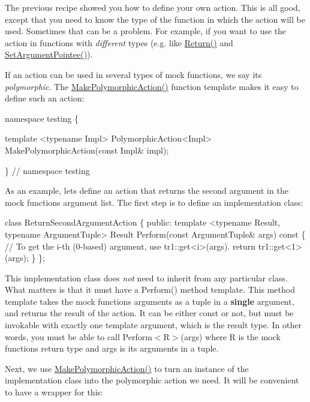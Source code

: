 The previous recipe showed you how to define your own action. This is all good, except that you need to know the type of the function in which the action will be used. Sometimes that can be a problem. For example, if you want to use the action in functions with {\itshape different} types (e.\+g. like {\ttfamily \hyperlink{namespacetesting_af6d1c13e9376c77671e37545cd84359c}{Return()}} and {\ttfamily \hyperlink{namespacetesting_a03b315d27c91a8e719f2b6c09964130b}{Set\+Argument\+Pointee()}}).

If an action can be used in several types of mock functions, we say it\textquotesingle{}s {\itshape polymorphic}. The {\ttfamily \hyperlink{namespacetesting_a36bd06c5ea972c6df0bd9f40a7a94c65}{Make\+Polymorphic\+Action()}} function template makes it easy to define such an action\+:


\begin{DoxyCode}
namespace testing \{

template <typename Impl>
PolymorphicAction<Impl> MakePolymorphicAction(const Impl& impl);

\}  // namespace testing
\end{DoxyCode}


As an example, let\textquotesingle{}s define an action that returns the second argument in the mock function\textquotesingle{}s argument list. The first step is to define an implementation class\+:


\begin{DoxyCode}
class ReturnSecondArgumentAction \{
 public:
  template <typename Result, typename ArgumentTuple>
  Result Perform(const ArgumentTuple& args) const \{
    // To get the i-th (0-based) argument, use tr1::get<i>(args).
    return tr1::get<1>(args);
  \}
\};
\end{DoxyCode}


This implementation class does {\itshape not} need to inherit from any particular class. What matters is that it must have a {\ttfamily Perform()} method template. This method template takes the mock function\textquotesingle{}s arguments as a tuple in a {\bfseries single} argument, and returns the result of the action. It can be either {\ttfamily const} or not, but must be invokable with exactly one template argument, which is the result type. In other words, you must be able to call {\ttfamily Perform$<$R$>$(args)} where {\ttfamily R} is the mock function\textquotesingle{}s return type and {\ttfamily args} is its arguments in a tuple.

Next, we use {\ttfamily \hyperlink{namespacetesting_a36bd06c5ea972c6df0bd9f40a7a94c65}{Make\+Polymorphic\+Action()}} to turn an instance of the implementation class into the polymorphic action we need. It will be convenient to have a wrapper for this\+:


